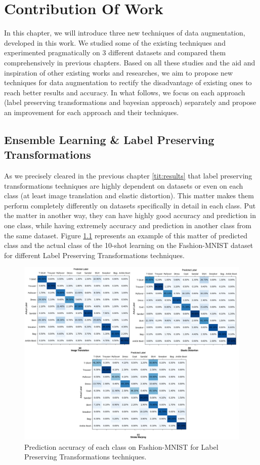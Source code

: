 \chapter{Contribution Of Work}
\label{tit:Contribution_of_Work}
In this chapter, we will introduce three new techniques of data augmentation, developed in this work. We studied some of the existing techniques and experimented pragmatically on $3$ different datasets and compared them comprehensively in previous chapters. Based on all these studies and the aid and inspiration of other existing works and researches, we aim to propose new techniques for data augmentation to rectify the disadvantage of existing ones to reach better results and accuracy. In what follows, we focus on each approach (label preserving transformations and bayesian approach) separately and propose an improvement for each approach and their techniques.

\section{Ensemble Learning \& Label Preserving Transformations}
As we precisely cleared in the previous chapter \ref{tit:results} that label preserving
transformations techniques are highly dependent on datasets or even on each class (at least image
translation and elastic distortion). This matter makes them perform completely differently on
datasets specifically in detail in each class. Put the matter in another way, they can have highly
good accuracy and prediction in one class, while having extremely accuracy and prediction in another
class from the same dataset. Figure \ref{fig:Fashion_MNIST_Heatmaps} represents an example of this matter of predicted class
and the actual class of the 10-shot learning on the Fashion-MNIST dataset for different  Label
Preserving Transformations techniques.

\begin{figure}
  \centering
  \label{fig:Fashion_MNIST_Heatmaps}
  \includegraphics[width=1.1\textwidth]{fig/contribution/Fashion_MNIST_Heatmap}
  \caption{Prediction accuracy of each class on Fashion-MNIST for Label Preserving Transformations techniques.}
\end{figure}

